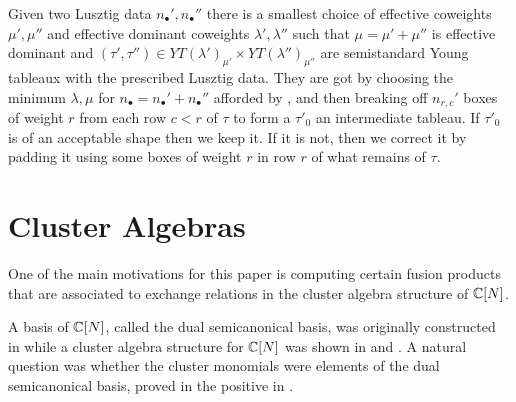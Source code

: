 \documentclass{article} %
\begin{document}
\begin{proposition}
    \label{prop:minwts}
    Given two Lusztig data $n_\bullet',n_\bullet''$ there is a smallest choice of effective coweights $\mu',\mu''$ and effective dominant coweights $\lambda',\lambda''$ such that $\mu = \mu' + \mu''$ is effective dominant and $(\tau',\tau'')\in YT(\lambda')_{\mu'}\times YT(\lambda'')_{\mu''}$ are semistandard Young tableaux with the prescribed Lusztig data. They are got by choosing the minimum $\lambda,\mu$ for $n_\bullet = n_\bullet ' + n_\bullet ''$ afforded by , and then breaking off $n_{r,c}'$ boxes of weight $r$ from each row $c<r$ of $\tau$ to form a $\tau'_0$ an intermediate tableau. If $\tau'_0$ is of an acceptable shape then we keep it. If it is not, then we correct it by padding it using some boxes of weight $r$ in row $r$ of what remains of $\tau$.

\end{proposition}

% 
\section{Cluster Algebras}
One of the main motivations for this paper is computing certain fusion products that are associated to exchange relations in the cluster algebra structure of $\mathbb C[N]$. 

A basis of $\mathbb C[N]$, called the dual semicanonical basis, was originally constructed in \cite{lusztig2000semicanonical} while a cluster algebra structure for $\mathbb C[N]$ was shown in \cite{berenstein2005cluster3} and \cite{geiss2007initial}.
A natural question was whether the cluster monomials were elements of the dual semicanonical basis, proved in the positive in \cite{geiss2006rigid}.
\end{document}
